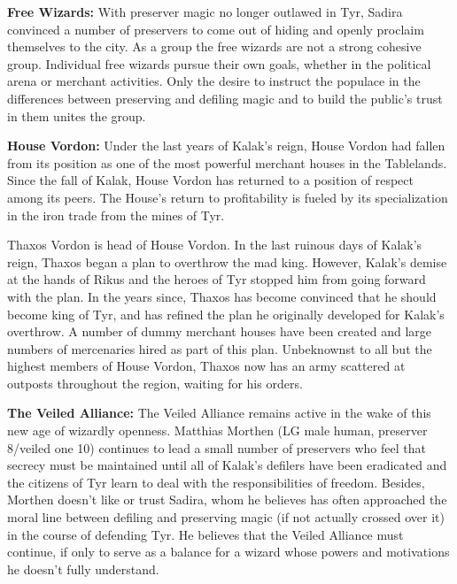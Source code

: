 {
	\textbf{Free Wizards:} With preserver magic no longer outlawed in Tyr, Sadira convinced a number of preservers to come out of hiding and openly proclaim themselves to the city. As a group the free wizards are not a strong cohesive group. Individual free wizards pursue their own goals, whether in the political arena or merchant activities. Only the desire to instruct the populace in the differences between preserving and defiling magic and to build the public’s trust in them unites the group.

	\textbf{House Vordon:} Under the last years of Kalak’s reign, House Vordon had fallen from its position as one of the most powerful merchant houses in the Tablelands. Since the fall of Kalak, House Vordon has returned to a position of respect among its peers. The House’s return to profitability is fueled by its specialization in the iron trade from the mines of Tyr.

	Thaxos Vordon is head of House Vordon. In the last ruinous days of Kalak’s reign, Thaxos began a plan to overthrow the mad king. However, Kalak’s demise at the hands of Rikus and the heroes of Tyr stopped him from going forward with the plan. In the years since, Thaxos has become convinced that he should become king of Tyr, and has refined the plan he originally developed for Kalak’s overthrow. A number of dummy merchant houses have been created and large numbers of mercenaries hired as part of this plan. Unbeknownst to all but the highest members of House Vordon, Thaxos now has an army scattered at outposts throughout the region, waiting for his orders.

	\textbf{The Veiled Alliance:} The Veiled Alliance remains active in the wake of this new age of wizardly openness. Matthias Morthen (LG male human, preserver 8/veiled one 10) continues to lead a small number of preservers who feel that secrecy must be maintained until all of Kalak’s defilers have been eradicated and the citizens of Tyr learn to deal with the responsibilities of freedom. Besides, Morthen doesn’t like or trust Sadira, whom he believes has often approached the moral line between defiling and preserving magic (if not actually crossed over it) in the course of defending Tyr. He believes that the Veiled Alliance must continue, if only to serve as a balance for a wizard whose powers and motivations he doesn’t fully understand.
}
